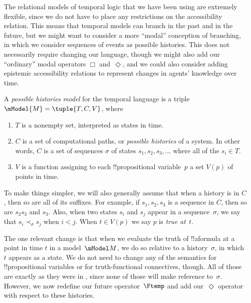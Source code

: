 \documentclass[../../../include/open-logic-section]{subfiles}
\begin{document}


The relational models of temporal logic that we have been using are extremely flexible, since we do not have to place
any restrictions on the accessibility relation. This means that temporal models can branch in the past and in the future,
but we might want to consider a more ``modal'' conception of branching, in which we consider sequences of events
as possible histories. This does not necessarily require changing our language, though we might also add our ``ordinary''
modal operators $\Box$ and~$\Diamond$, and we could also consider adding epistemic accessibility relations to 
represent changes in agents' knowledge over time.

\begin{defn}
  A \emph{possible histories model} for the temporal language is a triple
  $\mModel{M} = \tuple{T, C, V}$, where
  \begin{enumerate}
  \item $T$ is a nonempty set, interpreted as states in time.
  \item $C$ is a set of computational paths, or \emph{possible histories} of a system. In other
  words, $C$ is a set of sequences $\sigma$ of states $s_1, s_2, s_3, ...$ where all of the $s_i \in T$.
    \item $V$ is a function assigning to each !!{propositional variable}~$p$ a set $V(p)$ of points in time.
  \end{enumerate}
  To make things simpler, we will also generally assume that when a history is in $C$, then so are all of its suffixes. For example, if $s_1, s_2, s_3$ is a sequence in $C$, then so are $s_2 s_3$ and $s_3$. 
 Also, when two states $s_i$ and $s_j$ appear in a sequence~$\sigma$, we say that $s_i \prec_\sigma s_j$ when $i < j$. 
  When $t \in V(p)$ we say $p$ is \emph{true at}~$t$.
\end{defn}

The one relevant change is that when we evaluate the truth of
!!a{formula} at a point in time $t$ in a model~$\mModel M$, 
we do so relative to a history~$\sigma$, in which $t$ appears as a state. We do not need to change any of the semantics for !!{propositional variable}s or for truth-functional connectives, though. All of those are exactly as they were in , since none of those will make reference to~$\sigma$. However, we now redefine our future operator~$\Ftemp$ and add our~$\Diamond$ operator with respect to these histories. 
\end{document}
